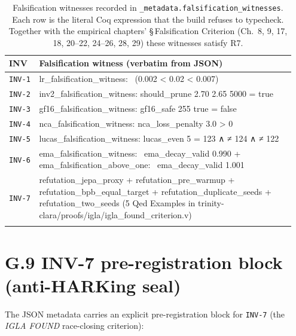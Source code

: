\begin{small}
\begin{longtable}{@{}p{0.10\linewidth}p{0.85\linewidth}@{}}
\toprule
\textbf{INV} & \textbf{Falsification witness (verbatim from JSON)} \\
\midrule
\endhead
\texttt{INV-1} & lr\_falsification\_witness: ~(0.002 < 0.02 < 0.007) \\
\texttt{INV-2} & inv2\_falsification\_witness: should\_prune 2.70 2.65 5000 = true \\
\texttt{INV-3} & gf16\_falsification\_witness: gf16\_safe 255 true = false \\
\texttt{INV-4} & nca\_falsification\_witness: nca\_loss\_penalty 3.0 > 0 \\
\texttt{INV-5} & lucas\_falsification\_witness: lucas\_even 5 = 123 ∧ ≠ 124 ∧ ≠ 122 \\
\texttt{INV-6} & ema\_falsification\_witness: ~ema\_decay\_valid 0.990 + ema\_falsification\_above\_one: ~ema\_decay\_valid 1.001 \\
\texttt{INV-7} & refutation\_jepa\_proxy + refutation\_pre\_warmup + refutation\_bpb\_equal\_target + refutation\_duplicate\_seeds + refutation\_two\_seeds (5 Qed Examples in trinity-clara/proofs/igla/igla\_found\_criterion.v) \\
\bottomrule
\caption{Falsification witnesses recorded in
  \texttt{\_metadata.falsification\_witnesses}. Each row is the literal Coq
  expression that the build refuses to typecheck. Together with the
  empirical chapters' \S\,Falsification Criterion (Ch.\ 8, 9, 17, 18, 20--22,
  24--26, 28, 29) these witnesses satisfy R7.}
\end{longtable}
\end{small}

\section*{G.9 INV-7 pre-registration block (anti-HARKing seal)}

\noindent The JSON metadata carries an explicit pre-registration block for
\texttt{INV-7} (the \emph{IGLA FOUND} race-closing criterion):

